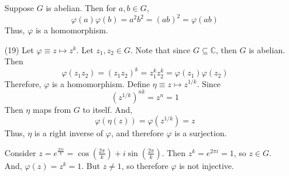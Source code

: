 \documentclass[12pt]{article}
\begin{document}
\begin{itemize}
Suppose $G$ is abelian. Then for $a, b \in G$,
$$\varphi(a)\varphi(b) = a^2b^2 = (ab)^2 = \varphi(ab)$$
Thus, $\varphi$ is a homomorphism.
\item[(19)]
Let $\varphi \equiv z \mapsto z^k$. Let $z_1, z_2 \in G$. Note that since $G \subseteq \mathbb{C}$, then $G$ is abelian. Then
$$\varphi(z_1z_2) = (z_1z_2)^k = z_1^kz_2^k = \varphi(z_1)\varphi(z_2)$$
Therefore, $\varphi$ is a homomorphism. Define $\eta \equiv z \mapsto z^{1/k}$. Since
$$(z^{1/k})^{nk} = z^{n} = 1$$
Then $\eta$ maps from $G$ to itself. And,
$$\varphi(\eta(z)) = \varphi(z^{1/k}) = z$$
Thus, $\eta$ is a right inverse of $\varphi$, and therefore $\varphi$ is a surjection.

Consider $z = e^{\frac{2\pi i}{k}} = \cos\left(\frac{2\pi}{k}\right) + i\sin\left(\frac{2\pi}{k}\right)$. Then $z^k = e^{2\pi i} = 1$, so $z \in G$. And, $\varphi(z) = z^k = 1$. But $z \neq 1$, so therefore $\varphi$ is not injective.
\end{itemize}
\end{document}

